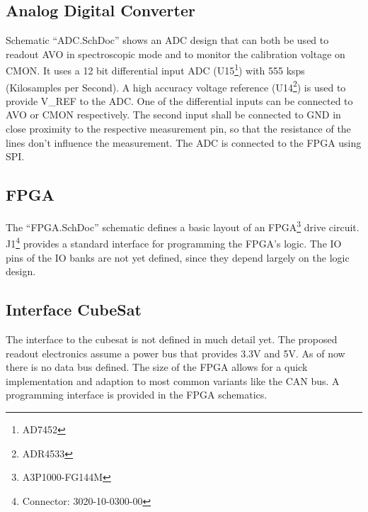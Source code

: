 \subsection{Analog Digital Converter}
\label{sec:adc}
Schematic ``ADC.SchDoc'' shows an ADC design that can both be used to readout AVO in spectroscopic mode and to monitor the calibration voltage on CMON.
It uses a 12 bit differential input ADC (U15\footnote{AD7452}) with 555 ksps (Kilosamples per Second).
A high accuracy voltage reference (U14\footnote{ADR4533}) is used to provide V_{REF} to the ADC.
One of the differential inputs can be connected to AVO or CMON respectively.
The second input shall be connected to GND in close proximity to the respective measurement pin, so that the resistance of the lines don't influence the measurement.
The ADC is connected to the FPGA using SPI.

\subsection{FPGA}
\label{sec:FPGA}
The ``FPGA.SchDoc'' schematic defines a basic layout of an FPGA\footnote{A3P1000-FG144M} drive circuit.
J1\footnote{Connector: 3020-10-0300-00} provides a standard interface for programming the FPGA's logic.
The IO pins of the IO banks are not yet defined, since they depend largely on the logic design.

\subsection{Interface CubeSat}
\label{sec:interface_cubesat}
The interface to the cubesat is not defined in much detail yet.
The proposed readout electronics assume a power bus that provides 3.3V and 5V.
As of now there is no data bus defined.
The size of the FPGA allows for a quick implementation and adaption to most common variants like the CAN bus.
A programming interface is provided in the FPGA schematics.
